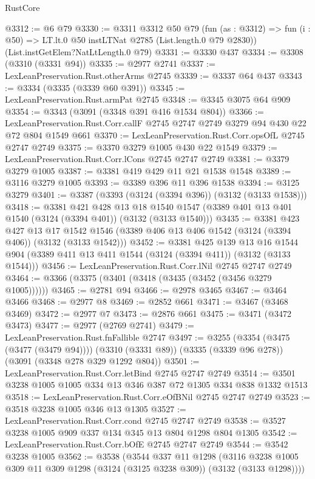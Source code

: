 \begin{lexlean}{RustCore}
\begin{coremodule}
@3312 := @6 @79
@3330 := @3311
    @3312
    @50
    @79
    (fun (as : @3312) => fun (i : @50) => LT.lt.{0} @50 instLTNat @2785 (List.length.{0} @79 @2830))
    (List.instGetElem?NatLtLength.{0} @79)
@3331 := @3330 @437
@3334 := @3308 (@3310 (@3331 @94))
@3335 := @2977 @2741
@3337 := LexLeanPreservation.Rust.otherArms @2745
@3339 := @3337 @64 @437
@3343 := @3334 (@3335 (@3339 @60 @391))
@3345 := LexLeanPreservation.Rust.armPat @2745
@3348 := @3345 @3075 @64 @909
@3354 := @3343 (@3091 (@3348 @391 @416 @1534 @804))
@3366 := LexLeanPreservation.Rust.Corr.callF
    @2745
    @2747
    @2749
    @3279
    @94
    @430
    @22
    @72
    @804
    @1549
    @661
@3370 := LexLeanPreservation.Rust.Corr.opsOfL @2745 @2747 @2749
@3375 := @3370 @3279 @1005 @430 @22 @1549
@3379 := LexLeanPreservation.Rust.Corr.lCons @2745 @2747 @2749
@3381 := @3379 @3279 @1005
@3387 := @3381 @419 @429 @11 @21 @1538 @1548
@3389 := @3116 @3279 @1005
@3393 := @3389 @396 @11 @396 @1538
@3394 := @3125 @3279
@3401 := @3387 (@3393 (@3124 (@3394 @396)) (@3132 (@3133 @1538)))
@3418 := @3381
    @421
    @428
    @13
    @18
    @1540
    @1547
    (@3389 @401 @13 @401 @1540 (@3124 (@3394 @401)) (@3132 (@3133 @1540)))
@3435 := @3381
    @423
    @427
    @13
    @17
    @1542
    @1546
    (@3389 @406 @13 @406 @1542 (@3124 (@3394 @406)) (@3132 (@3133 @1542)))
@3452 := @3381
    @425
    @139
    @13
    @16
    @1544
    @904
    (@3389 @411 @13 @411 @1544 (@3124 (@3394 @411)) (@3132 (@3133 @1544)))
@3456 := LexLeanPreservation.Rust.Corr.lNil @2745 @2747 @2749
@3464 := @3366 (@3375 (@3401 (@3418 (@3435 (@3452 (@3456 @3279 @1005))))))
@3465 := @2781 @94
@3466 := @2978 @3465
@3467 := @3464 @3466
@3468 := @2977 @8
@3469 := @2852 @661
@3471 := @3467 (@3468 @3469)
@3472 := @2977 @7
@3473 := @2876 @661
@3475 := @3471 (@3472 @3473)
@3477 := @2977 (@2769 @2741)
@3479 := LexLeanPreservation.Rust.fnFallible @2747
@3497 := @3255
    (@3354 (@3475 (@3477 (@3479 @94))))
    (@3310 (@3331 @89))
    (@3335 (@3339 @96 @278))
    (@3091 (@3348 @278 @329 @1292 @804))
@3501 := LexLeanPreservation.Rust.Corr.letBind @2745 @2747 @2749
@3514 := @3501 @3238 @1005 @1005 @334 @13 @346 @387 @72 @1305 @334 @838 @1332 @1513
@3518 := LexLeanPreservation.Rust.Corr.eOfBNil @2745 @2747 @2749
@3523 := @3518 @3238 @1005 @346 @13 @1305
@3527 := LexLeanPreservation.Rust.Corr.cond @2745 @2747 @2749
@3538 := @3527 @3238 @1005 @909 @337 @134 @345 @13 @804 @1298 @804 @1305
@3542 := LexLeanPreservation.Rust.Corr.bOfE @2745 @2747 @2749
@3544 := @3542 @3238 @1005
@3562 := @3538
    (@3544
      @337
      @11
      @1298
      (@3116 @3238 @1005 @309 @11 @309 @1298 (@3124 (@3125 @3238 @309)) (@3132 (@3133 @1298))))

\end{coremodule}
\end{lexlean}
